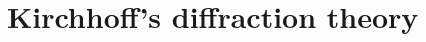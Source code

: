 \documentclass[12pt,twoside,english]{book}
\renewcommand{\~}{\perispomeni}%
\numberwithin{equation}{section}
\numberwithin{figure}{section}
\begin{document}
%
%
\section{Kirchhoff's diffraction theory}

\begin{figure}
\begin{minipage}[t]{0.48\textwidth}

\caption{}
\label{fig:aperture}
\end{minipage}
\hfill
\begin{minipage}[t]{0.48\textwidth}

\caption{}
\label{fig:aperture coord}
\end{minipage}
\end{figure}
\end{document}
